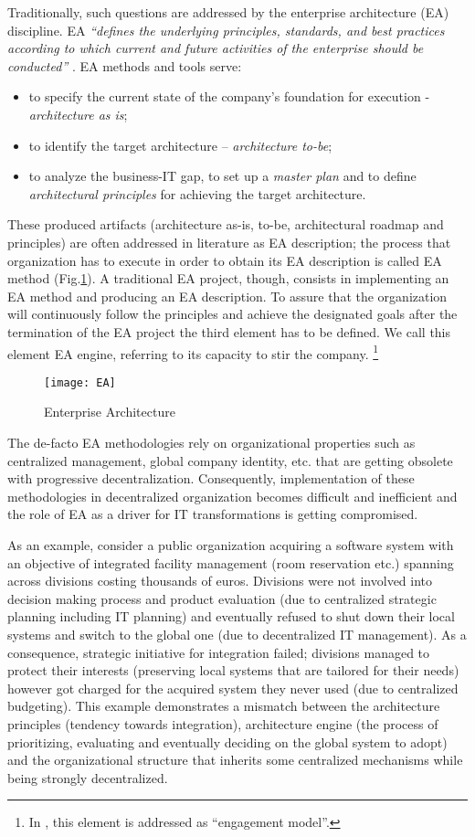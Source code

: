 Traditionally, such questions are addressed by the enterprise architecture (EA) discipline. 
EA \textit{``defines the underlying principles, standards, and best practices according to which current and future activities of the enterprise should be conducted''} \cite{jungle2004}. EA methods and tools serve:
\begin{itemize}
\item to specify the current state of the company's foundation for execution \cite{ross2006}  - \textit{architecture as is};
\item to identify the target architecture – \textit{architecture to-be};
\item to analyze the business-IT gap, to set up a \textit{master plan} and to define \textit{architectural principles} for achieving the target architecture.
\end{itemize}
These produced artifacts (architecture as-is, to-be, architectural roadmap and principles) are often addressed in literature as EA description; the process that organization has to execute in order to obtain its EA description is called EA method (Fig.\ref{fig:EA_general}). A traditional EA project, though, consists in implementing an EA method and producing an EA description. To assure that the organization will continuously follow the principles and achieve the designated goals after the termination of the EA project   the third element has to be defined.  We call this element EA engine, referring to its capacity to stir the company. \footnote{In \cite{ross2006}, this element is addressed as ``engagement model''.}
\begin{figure}
\centering
\texttt{[image: EA]}
\caption{Enterprise Architecture}
\label{fig:EA_general}
\end{figure}
The de-facto EA methodologies rely on organizational properties such as centralized management, global company identity, etc.  that are getting obsolete with progressive decentralization.  Consequently, implementation of these methodologies in decentralized organization becomes difficult and inefficient and  the role of EA as a driver for IT transformations is getting compromised.

As an example, consider a public organization acquiring a software system with an objective of integrated facility management (room reservation etc.) spanning across divisions costing thousands of euros. Divisions were not involved into decision making process and product evaluation (due to centralized strategic planning including IT planning) and eventually refused to shut down their local systems and switch to the global one (due to decentralized IT management). As a consequence, strategic initiative for integration failed; divisions managed to protect their interests  (preserving local  systems  that  are  tailored for their needs) however got charged for the acquired system they never used (due to centralized budgeting). This example demonstrates a mismatch between the architecture principles (tendency towards integration), architecture engine (the process of prioritizing, evaluating and eventually deciding on the global system to adopt) and the organizational structure that inherits some centralized mechanisms while being strongly decentralized.

